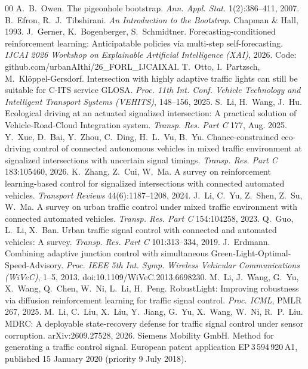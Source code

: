 \begin{thebibliography}{00}
 A.~B.~Owen. The pigeonhole bootstrap. \emph{Ann. Appl. Stat.} 1(2):386--411, 2007.
 B.~Efron, R.~J.~Tibshirani. \emph{An Introduction to the Bootstrap}. Chapman \& Hall, 1993.
 J.~Gerner, K.~Bogenberger, S.~Schmidtner. Forecasting-conditioned reinforcement learning: Anticipatable policies via multi-step self-forecasting. \emph{IJCAI 2026 Workshop on Explainable Artificial Intelligence (XAI)}, 2026. Code: github.com/urbanAIthi/26\_FORL\_IJCAIXAI.
 T.~Otto, I.~Partzsch, M.~Kl\"oppel-Gersdorf. Intersection with highly adaptive traffic lights can still be suitable for C-ITS service GLOSA. \emph{Proc. 11th Int. Conf. Vehicle Technology and Intelligent Transport Systems (VEHITS)}, 148--156, 2025.
 S.~Li, H.~Wang, J.~Hu. Ecological driving at an actuated signalized intersection: A practical solution of Vehicle-Road-Cloud Integration system. \emph{Transp. Res. Part C} 177, Aug. 2025.
 Y.~Xue, D.~Bai, Y.~Zhou, C.~Ding, H.~L.~Vu, B.~Yu. Chance-constrained eco-driving control of connected autonomous vehicles in mixed traffic environment at signalized intersections with uncertain signal timings. \emph{Transp. Res. Part C} 183:105460, 2026.
 K.~Zhang, Z.~Cui, W.~Ma. A survey on reinforcement learning-based control for signalized intersections with connected automated vehicles. \emph{Transport Reviews} 44(6):1187--1208, 2024.
 J.~Li, C.~Yu, Z.~Shen, Z.~Su, W.~Ma. A survey on urban traffic control under mixed traffic environment with connected automated vehicles. \emph{Transp. Res. Part C} 154:104258, 2023.
 Q.~Guo, L.~Li, X.~Ban. Urban traffic signal control with connected and automated vehicles: A survey. \emph{Transp. Res. Part C} 101:313--334, 2019.
 J.~Erdmann. Combining adaptive junction control with simultaneous Green-Light-Optimal-Speed-Advisory. \emph{Proc. IEEE 5th Int. Symp. Wireless Vehicular Communications (WiVeC)}, 1--5, 2013. doi:10.1109/WiVeC.2013.6698230.
 M.~Li, J.~Wang, G.~Yu, X.~Wang, Q.~Chen, W.~Ni, L.~Li, H.~Peng. RobustLight: Improving robustness via diffusion reinforcement learning for traffic signal control. \emph{Proc. ICML}, PMLR 267, 2025.
 M.~Li, C.~Liu, X.~Liu, Y.~Jiang, G.~Yu, X.~Wang, W.~Ni, R.~P.~Liu. MDRC: A deployable state-recovery defense for traffic signal control under sensor corruption. arXiv:2609.27528, 2026.
 Siemens Mobility GmbH. Method for generating a traffic control signal. European patent application EP\,3\,594\,920\,A1, published 15 January 2020 (priority 9 July 2018).

\end{thebibliography}
